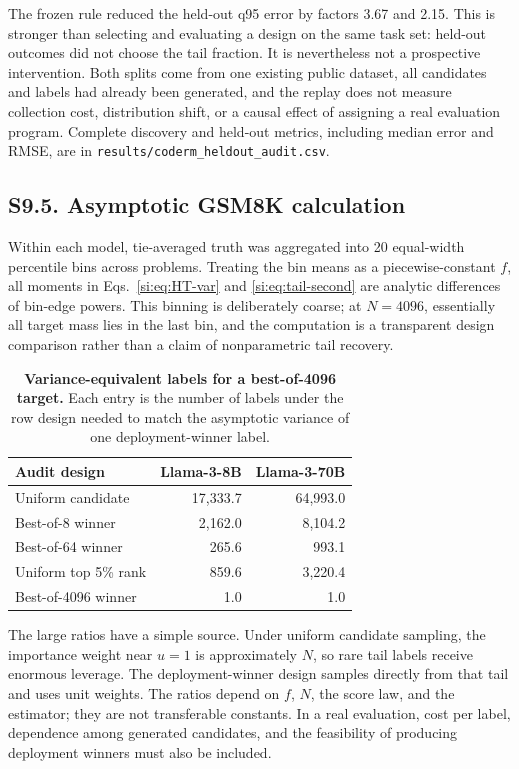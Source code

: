 The frozen rule reduced the held-out q95 error by factors 3.67 and 2.15. This is stronger than selecting and evaluating a design on the same task set: held-out outcomes did not choose the tail fraction. It is nevertheless not a prospective intervention. Both splits come from one existing public dataset, all candidates and labels had already been generated, and the replay does not measure collection cost, distribution shift, or a causal effect of assigning a real evaluation program. Complete discovery and held-out metrics, including median error and RMSE, are in \texttt{results/coderm\_heldout\_audit.csv}.

\subsection*{S9.5. Asymptotic GSM8K calculation}

Within each model, tie-averaged truth was aggregated into 20 equal-width percentile bins across problems. Treating the bin means as a piecewise-constant $f$, all moments in Eqs.~\ref{si:eq:HT-var} and \ref{si:eq:tail-second} are analytic differences of bin-edge powers. This binning is deliberately coarse; at $N=4096$, essentially all target mass lies in the last bin, and the computation is a transparent design comparison rather than a claim of nonparametric tail recovery.

\begin{table}[h]
\centering
\caption{\textbf{Variance-equivalent labels for a best-of-4096 target.} Each entry is the number of labels under the row design needed to match the asymptotic variance of one deployment-winner label.}
\label{si:tab:efficiency}
\begin{tabular}{lrr}
\toprule
Audit design & Llama-3-8B & Llama-3-70B \\
\midrule
Uniform candidate & 17,333.7 & 64,993.0 \\
Best-of-8 winner & 2,162.0 & 8,104.2 \\
Best-of-64 winner & 265.6 & 993.1 \\
Uniform top 5\% rank & 859.6 & 3,220.4 \\
Best-of-4096 winner & 1.0 & 1.0 \\
\bottomrule
\end{tabular}
\end{table}

The large ratios have a simple source. Under uniform candidate sampling, the importance weight near $u=1$ is approximately $N$, so rare tail labels receive enormous leverage. The deployment-winner design samples directly from that tail and uses unit weights. The ratios depend on $f$, $N$, the score law, and the estimator; they are not transferable constants. In a real evaluation, cost per label, dependence among generated candidates, and the feasibility of producing deployment winners must also be included.

